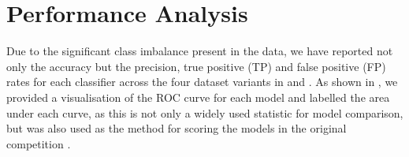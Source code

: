 \documentclass{article}
\def\abovestrut#1{\rule[0in]{0in}{#1}\ignorespaces}
\def\belowstrut#1{\rule[-#1]{0in}{#1}\ignorespaces}
\def\abovespace{\abovestrut{0.20in}}
\def\belowspace{\belowstrut{0.10in}}
\begin{document}
\section{Performance Analysis}



Due to the significant class imbalance present in the data, we have reported not only the accuracy but the precision, true positive (TP) and false positive (FP) rates for each classifier across the four dataset variants in  and .
As shown in , we provided a visualisation of the ROC curve for each model and labelled the area under each curve, as this is not only a widely used statistic for model comparison, but was also used as the method for scoring the models in the original competition \cite{guyon2009analysis}.
\end{document}
